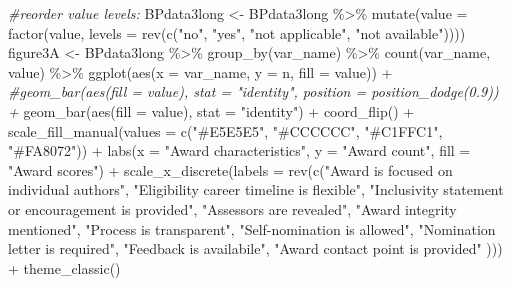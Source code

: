 \documentclass[
]{article}
\newenvironment{Shaded}{\begin{snugshade}}{\end{snugshade}}
\newcommand{\AttributeTok}[1]{\textcolor[rgb]{0.77,0.63,0.00}{#1}}
\newcommand{\CommentTok}[1]{\textcolor[rgb]{0.56,0.35,0.01}{\textit{#1}}}
\newcommand{\FunctionTok}[1]{\textcolor[rgb]{0.00,0.00,0.00}{#1}}
\newcommand{\NormalTok}[1]{#1}
\newcommand{\OtherTok}[1]{\textcolor[rgb]{0.56,0.35,0.01}{#1}}
\newcommand{\SpecialCharTok}[1]{\textcolor[rgb]{0.00,0.00,0.00}{#1}}
\newcommand{\StringTok}[1]{\textcolor[rgb]{0.31,0.60,0.02}{#1}}
\begin{document}
\begin{Shaded}
\begin{Highlighting}[]
\CommentTok{\#reorder value levels:}
\NormalTok{BPdata3long }\OtherTok{\textless{}{-}}\NormalTok{ BPdata3long }\SpecialCharTok{\%\textgreater{}\%} \FunctionTok{mutate}\NormalTok{(}\AttributeTok{value =} \FunctionTok{factor}\NormalTok{(value, }\AttributeTok{levels =} \FunctionTok{rev}\NormalTok{(}\FunctionTok{c}\NormalTok{(}\StringTok{"no"}\NormalTok{,}
                                                                            \StringTok{"yes"}\NormalTok{, }
                                                                            \StringTok{"not applicable"}\NormalTok{, }
                                                                            \StringTok{"not available"}\NormalTok{))))}
\NormalTok{figure3A }\OtherTok{\textless{}{-}}\NormalTok{ BPdata3long }\SpecialCharTok{\%\textgreater{}\%} 
  \FunctionTok{group\_by}\NormalTok{(var\_name) }\SpecialCharTok{\%\textgreater{}\%} 
  \FunctionTok{count}\NormalTok{(var\_name, value) }\SpecialCharTok{\%\textgreater{}\%} 
  \FunctionTok{ggplot}\NormalTok{(}\FunctionTok{aes}\NormalTok{(}\AttributeTok{x =}\NormalTok{ var\_name, }\AttributeTok{y =}\NormalTok{ n, }\AttributeTok{fill =}\NormalTok{ value)) }\SpecialCharTok{+}
  \CommentTok{\#geom\_bar(aes(fill = value), stat = "identity", position = position\_dodge(0.9)) +}
  \FunctionTok{geom\_bar}\NormalTok{(}\FunctionTok{aes}\NormalTok{(}\AttributeTok{fill =}\NormalTok{ value), }\AttributeTok{stat =} \StringTok{"identity"}\NormalTok{) }\SpecialCharTok{+}
  \FunctionTok{coord\_flip}\NormalTok{() }\SpecialCharTok{+}
  \FunctionTok{scale\_fill\_manual}\NormalTok{(}\AttributeTok{values =} \FunctionTok{c}\NormalTok{(}\StringTok{"\#E5E5E5"}\NormalTok{, }\StringTok{"\#CCCCCC"}\NormalTok{, }\StringTok{"\#C1FFC1"}\NormalTok{,  }\StringTok{"\#FA8072"}\NormalTok{)) }\SpecialCharTok{+}
  \FunctionTok{labs}\NormalTok{(}\AttributeTok{x =} \StringTok{"Award characteristics"}\NormalTok{, }\AttributeTok{y =} \StringTok{"Award count"}\NormalTok{, }\AttributeTok{fill =} \StringTok{"Award scores"}\NormalTok{) }\SpecialCharTok{+} 
  \FunctionTok{scale\_x\_discrete}\NormalTok{(}\AttributeTok{labels =} \FunctionTok{rev}\NormalTok{(}\FunctionTok{c}\NormalTok{(}\StringTok{"Award is focused on individual authors"}\NormalTok{,}
                            \StringTok{"Eligibility career timeline is flexible"}\NormalTok{, }
                            \StringTok{"Inclusivity statement or encouragement is provided"}\NormalTok{,}
                            \StringTok{"Assessors are revealed"}\NormalTok{,}
                            \StringTok{"Award integrity mentioned"}\NormalTok{, }
                            \StringTok{"Process is transparent"}\NormalTok{,}
                            \StringTok{"Self{-}nomination is allowed"}\NormalTok{,}
                            \StringTok{"Nomination letter is required"}\NormalTok{,}
                            \StringTok{"Feedback is availabile"}\NormalTok{, }
                            \StringTok{"Award contact point is provided"}
\NormalTok{                            ))) }\SpecialCharTok{+}
  \FunctionTok{theme\_classic}\NormalTok{()}
\end{Highlighting}
\end{Shaded}
\end{document}
